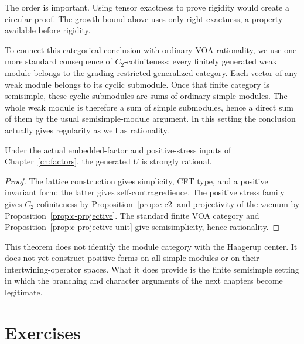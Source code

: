 The order is important. Using tensor exactness to prove rigidity would
create a circular proof. The growth bound above uses only right
exactness, a property available before rigidity.

To connect this categorical conclusion with ordinary VOA rationality,
we use one more standard consequence of $C_2$-cofiniteness: every
finitely generated weak module belongs to the grading-restricted
generalized category. Each vector of any weak module belongs to its
cyclic submodule. Once that finite category is semisimple, these cyclic
submodules are sums of ordinary simple modules. The whole weak module
is therefore a sum of simple submodules, hence a direct sum of them
by the usual semisimple-module argument. In this setting the conclusion
actually gives regularity as well as rationality.

\begin{theorem}
Under the actual embedded-factor and positive-stress inputs of
Chapter~\ref{ch:factors}, the generated $U$ is strongly rational.
\end{theorem}
\begin{proof}
The lattice construction gives simplicity, CFT type, and a positive
invariant form; the latter gives self-contragredience. The positive
stress family gives $C_2$-cofiniteness by
Proposition~\ref{prop:c-c2} and projectivity of the vacuum by
Proposition~\ref{prop:c-projective}. The standard finite VOA category
and Proposition~\ref{prop:c-projective-unit} give semisimplicity,
hence rationality.
\end{proof}

This theorem does not identify the module category with the Haagerup
center. It does not yet construct positive forms on all simple modules
or on their intertwining-operator spaces. What it does provide is the
finite semisimple setting in which the branching and character arguments
of the next chapters become legitimate.

\section{Exercises}

